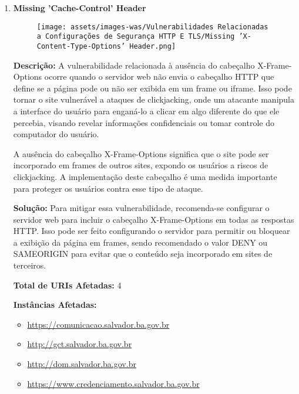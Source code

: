 \documentclass[a4paper,12pt]{article}
\begin{document}
\begin{enumerate}
\item \textbf{Missing 'Cache-Control' Header}

                        \begin{figure}[h!]
                        \centering
                        \texttt{[image: assets/images-was/Vulnerabilidades Relacionadas a Configurações de Segurança HTTP E TLS/Missing 'X-Content-Type-Options' Header.png]}
                        \end{figure}
                        \FloatBarrier
                        \textbf{Descrição:} A vulnerabilidade relacionada à ausência do cabeçalho X-Frame-Options ocorre quando o servidor web não envia o cabeçalho HTTP que define se a página pode ou não ser exibida em um frame ou iframe. Isso pode tornar o site vulnerável a ataques de clickjacking, onde um atacante manipula a interface do usuário para enganá-lo a clicar em algo diferente do que ele percebia, visando revelar informações confidenciais ou tomar controle do computador do usuário.

    A ausência do cabeçalho X-Frame-Options significa que o site pode ser incorporado em frames de outros sites, expondo os usuários a riscos de clickjacking. A implementação deste cabeçalho é uma medida importante para proteger os usuários contra esse tipo de ataque.

\textbf{Solução:} Para mitigar essa vulnerabilidade, recomenda-se configurar o servidor web para incluir o cabeçalho X-Frame-Options em todas as respostas HTTP. Isso pode ser feito configurando o servidor para permitir ou bloquear a exibição da página em frames, sendo recomendado o valor DENY ou SAMEORIGIN para evitar que o conteúdo seja incorporado em sites de terceiros.

\textbf{Total de URIs Afetadas:} 4

\textbf{Instâncias Afetadas:}
\begin{itemize}
    \item \url{https://comunicacao.salvador.ba.gov.br}
    \item \url{http://gct.salvador.ba.gov.br}
    \item \url{http://dom.salvador.ba.gov.br}
    \item \url{https://www.credenciamento.salvador.ba.gov.br}
\end{itemize}


\end{enumerate}
\end{document}
